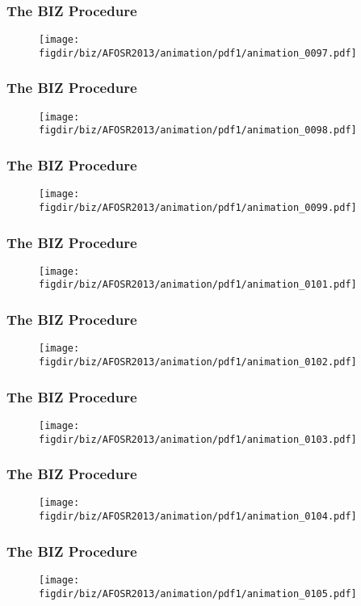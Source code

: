 \documentclass[13pt]{beamer}
\newcommand{\figdir}{../../fig}
\begin{document}
{\begin{frame}\frametitle{The BIZ Procedure}\begin{figure}\texttt{[image: \\figdir/biz/AFOSR2013/animation/pdf1/animation\_0097.pdf]}\end{figure}\end{frame}
\begin{frame}\frametitle{The BIZ Procedure}\begin{figure}\texttt{[image: \\figdir/biz/AFOSR2013/animation/pdf1/animation\_0098.pdf]}\end{figure}\end{frame}
\begin{frame}\frametitle{The BIZ Procedure}\begin{figure}\texttt{[image: \\figdir/biz/AFOSR2013/animation/pdf1/animation\_0099.pdf]}\end{figure}\end{frame}
\begin{frame}\frametitle{The BIZ Procedure}\begin{figure}\texttt{[image: \\figdir/biz/AFOSR2013/animation/pdf1/animation\_0101.pdf]}\end{figure}\end{frame}
\begin{frame}\frametitle{The BIZ Procedure}\begin{figure}\texttt{[image: \\figdir/biz/AFOSR2013/animation/pdf1/animation\_0102.pdf]}\end{figure}\end{frame}
\begin{frame}\frametitle{The BIZ Procedure}\begin{figure}\texttt{[image: \\figdir/biz/AFOSR2013/animation/pdf1/animation\_0103.pdf]}\end{figure}\end{frame}
\begin{frame}\frametitle{The BIZ Procedure}\begin{figure}\texttt{[image: \\figdir/biz/AFOSR2013/animation/pdf1/animation\_0104.pdf]}\end{figure}\end{frame}
\begin{frame}\frametitle{The BIZ Procedure}\begin{figure}\texttt{[image: \\figdir/biz/AFOSR2013/animation/pdf1/animation\_0105.pdf]}\end{figure}\end{frame}
}
\end{document}
